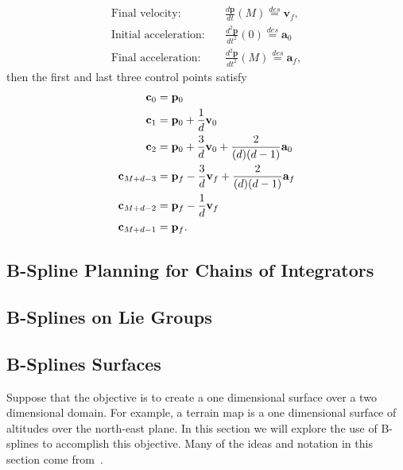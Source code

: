 \begin{corollary}
\begin{description}
\begin{align*}
			\text{Final velocity:} &\quad \frac{d\mathbf{p}}{dt}(M) \stackrel{des}{=} \mathbf{v}_f, \\
			\text{Initial acceleration:} &\quad \frac{d^2\mathbf{p}}{dt^2}(0) \stackrel{des}{=} \mathbf{a}_0 \\	
			\text{Final acceleration:} &\quad \frac{d^2\mathbf{p}}{dt^2}(M) \stackrel{des}{=} \mathbf{a}_f,
		\end{align*}
		then the first and last three control points satisfy
		\begin{align*}
			\mathbf{c}_0 &= \mathbf{p}_0 \\
			\mathbf{c}_1 &= \mathbf{p}_0 + \frac{1}{d} \mathbf{v}_0 \\
			\mathbf{c}_2 &= \mathbf{p}_0 + \frac{3}{d} \mathbf{v}_0 + \frac{2}{(d)(d-1)}\mathbf{a}_0 \\
			\mathbf{c}_{M+d-3} &= \mathbf{p}_f - \frac{3}{d}\mathbf{v}_f + \frac{2}{(d)(d-1)}\mathbf{a}_f \\
			\mathbf{c}_{M+d-2} &= \mathbf{p}_f - \frac{1}{d}\mathbf{v}_f \\
			\mathbf{c}_{M+d-1} &= \mathbf{p}_f.
		\end{align*}
	\end{description}
\end{corollary}



\subsection{B-Spline Planning for Chains of Integrators}

\subsection{B-Splines on Lie Groups}

\subsection{B-Splines Surfaces}

Suppose that the objective is to create a one dimensional surface over a two dimensional domain.  For example, a terrain map is a one dimensional surface of altitudes over the north-east plane.  In this section we will explore the use of B-splines to accomplish this objective. Many of the ideas and notation in this section come from~\cite{RodriguesTsiogkasAguiar20}.

